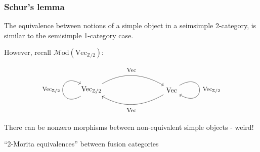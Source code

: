 \documentclass{beamer}
\newcommand{\ZZ}{{\mathbb{Z}}}
\newcommand{\Vect}{{\textrm{Vec}}}
\newcommand{\Mod}{{\mathcal{M}\textrm{od}}}
\newcommand{\ModA}[1]{{\Mod(#1)}}
\begin{document}
\begin{frame}
\frametitle{Schur's lemma}

The equivalence between notions of a simple object
in a seimsimple 2-category,
is similar to the semisimple 1-category case.

\pause

However, recall $\ModA{\Vect_{\ZZ/2}}$:

\[
\begin{tikzpicture}
\node (a) at (0,0) {$\Vect_{\ZZ/2}$};
\node (b) at (4,0) {$\Vect$};
\draw[->] (a) to[out=30,in=150] (b);
\node at (2,1) {\footnotesize $\Vect$};
\draw[->] (b) to[out=-150,in=-30] (a);
\node at (2,-1) {\footnotesize $\Vect$};
\draw[->] (a) .. controls +(-150:2cm) and +(150:2cm) .. (a);
\node at (-2,0) {\footnotesize $\Vect_{\ZZ/2}$};
\draw[->] (b) .. controls +(30:2cm) and +(-30:2cm) .. (b);
\node at (6,0) {\footnotesize $\Vect_{\ZZ/2}$};
\end{tikzpicture}
\]

\pause

There can be nonzero morphisms between
non-equivalent simple objects - weird!

\pause

``2-Morita equivalences'' between fusion categories


\end{frame}
\end{document}
